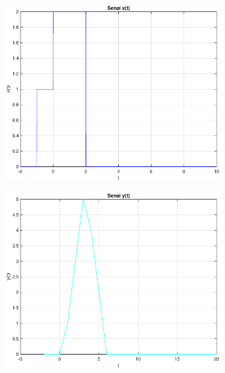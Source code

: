 \documentclass[journal]{IEEEtran}
\begin{document}
\includegraphics [width=8cm]{ejercicio_2_02.eps}

\includegraphics [width=8cm]{ejercicio_2_03.eps}



    
\end{document}
